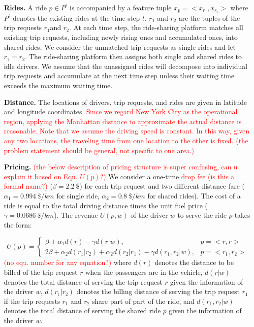 \documentclass[sigconf]{acmart}
\newcommand{\tcr}[1]{{\textcolor{red}{#1}}}
\begin{document}
\textbf{Rides. }A ride $p\in P^{t}$ is accompanied by a feature tuple
$x_{p}=<x_{r_{1}},x_{r_{2}}>$ where $P^{t}$ denotes the existing
rides at the time step $t$, $r_{1}$ and $r_{2}$ are the tuples
of the trip requests $r_{1}$and $r_{2}$. At each time step, the
ride-sharing platform matches all existing trip requests, including
newly rising ones and accumulated ones, into shared rides. We consider
the unmatched trip requests as single rides and let $r_{1}=r_{2}$.
The ride-sharing platform then assigns both single and shared rides
to idle drivers. We assume that the unassigned rides will decompose
into individual trip requests and accumulate at the next time step
unless their waiting time exceeds the maximum waiting time.

\textbf{Distance.} The locations of drivers, trip requests, and rides
are given in latitude and longitude coordinates. \tcr{Since we regard New
York City as the operational region, applying the Manhattan distance
to approximate the actual distance is reasonable. Note that we assume
the driving speed is constant. In this way, given any two locations,
the traveling time from one location to the other is fixed. (the problem statement should be general, not specific to one area.)}

\textbf{Pricing. }%
\tcr{(the below description of pricing structure is super confusing, can u explain it based on Equ. $U(p)$?)}
We consider a one-time
\tcr{drop fee (is this a formal name?)} ($\beta=2.2\ \$$) for each trip request and two different
distance fare ($\alpha_{1}=0.994\ \$/km$ for single ride, $\alpha_{2}=0.8\ \$/km$
for shared rides). 
The cost of a ride is equal to the total driving
distance times the unit fuel price ($\gamma=0.0686\ \$/km$). The
revenue $U(p,w)$ of the driver $w$ to serve the ride $p$ takes
the form: 

\[
U(p)=\begin{cases}
\beta+\alpha_{1}d(r)-\gamma d(r|w), & p=<r,r>\\
2\beta+\alpha_{2}d(r_{1}|r_{2})+\alpha_{2}d(r_{2}|r_{1})-\gamma d(r_{1},r_{2}|w), & p=<r_{1},r_{2}>
\end{cases}
\]
\tcr{(no equ. number for any equation?)}
where $d(r)$ denotes the distance to be billed of the trip request
$r$ when the passengers are in the vehicle, $d(r|w)$ denotes the
total distance of serving the trip request $r$ given the information
of the driver $w$, $d(r_{1}|r_{2})$ denotes the billing distance
of serving the trip request $r_{1}$ if the trip requests $r_{1}$
and $r_{2}$ share part of part of the ride, and $d(r_{1},r_{2}|w)$
denotes the total distance of serving the shared ride $p$ given the
information of the driver $w$.
\end{document}
